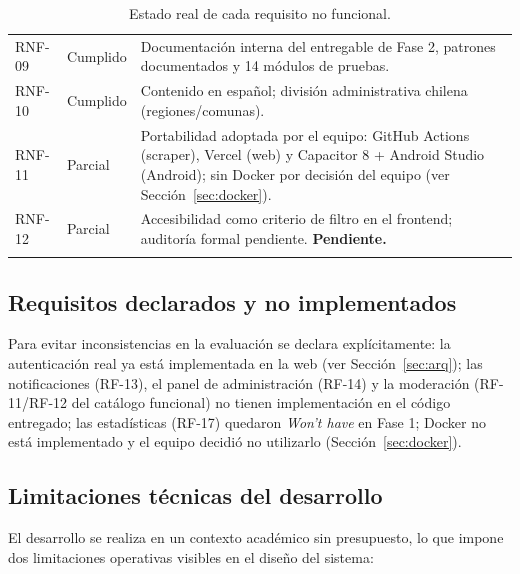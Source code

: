 \begin{longtable}{l l p{9.3cm}}
RNF-09 & Cumplido & Documentación interna del entregable de Fase 2, patrones documentados y 14 módulos de pruebas. \\
RNF-10 & Cumplido & Contenido en español; división administrativa chilena (regiones/comunas). \\
RNF-11 & Parcial & Portabilidad adoptada por el equipo: GitHub Actions (scraper), Vercel (web) y Capacitor 8 + Android Studio (Android); sin Docker por decisión del equipo (ver Sección~\ref{sec:docker}). \\
RNF-12 & Parcial & Accesibilidad como criterio de filtro en el frontend; auditoría formal pendiente. \textcolor{rojo}{\textbf{Pendiente.}} \\
\bottomrule
\caption{Estado real de cada requisito no funcional.}
\label{tab:rnfestado}
\end{longtable}

\subsection{Requisitos declarados y no implementados}

Para evitar inconsistencias en la evaluación se declara explícitamente: la autenticación
real ya está implementada en la web (ver Sección~\ref{sec:arq}); las notificaciones
(RF-13), el panel de administración (RF-14) y la moderación (RF-11/RF-12 del catálogo funcional) no
tienen implementación en el código entregado; las estadísticas (RF-17) quedaron
\emph{Won't have} en Fase 1; Docker no está implementado y el equipo decidió no utilizarlo
(Sección~\ref{sec:docker}).

\subsection{Limitaciones técnicas del desarrollo}

El desarrollo se realiza en un contexto académico sin presupuesto, lo que impone dos
limitaciones operativas visibles en el diseño del sistema:

